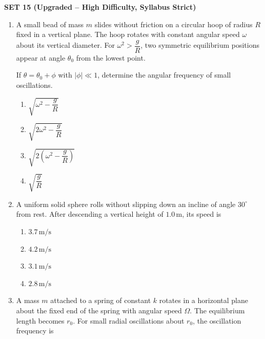 \documentclass[12pt]{article}
\begin{document}
\begin{center}
\Large\textbf{SET 15 (Upgraded – High Difficulty, Syllabus Strict)}
\end{center}

\begin{enumerate}

\item A small bead of mass $m$ slides without friction on a circular hoop of radius $R$ fixed in a vertical plane. The hoop rotates with constant angular speed $\omega$ about its vertical diameter. For $\omega^2 > \dfrac{g}{R}$, two symmetric equilibrium positions appear at angle $\theta_0$ from the lowest point.

If $\theta = \theta_0 + \phi$ with $|\phi|\ll1$, determine the angular frequency of small oscillations.

\begin{center}
\end{center}

\begin{enumerate}
\item $\sqrt{\omega^2 - \dfrac{g}{R}}$
\item $\sqrt{2\omega^2 - \dfrac{g}{R}}$
\item $\sqrt{2\left(\omega^2 - \dfrac{g}{R}\right)}$
\item $\sqrt{\dfrac{g}{R}}$
\end{enumerate}

\item A uniform solid sphere rolls without slipping down an incline of angle $30^\circ$ from rest. After descending a vertical height of $1.0\,\text{m}$, its speed is

\begin{enumerate}
\item $3.7\,\text{m/s}$
\item $4.2\,\text{m/s}$
\item $3.1\,\text{m/s}$
\item $2.8\,\text{m/s}$
\end{enumerate}

\item A mass $m$ attached to a spring of constant $k$ rotates in a horizontal plane about the fixed end of the spring with angular speed $\Omega$. The equilibrium length becomes $r_0$. For small radial oscillations about $r_0$, the oscillation frequency is


\end{enumerate}
\end{document}
